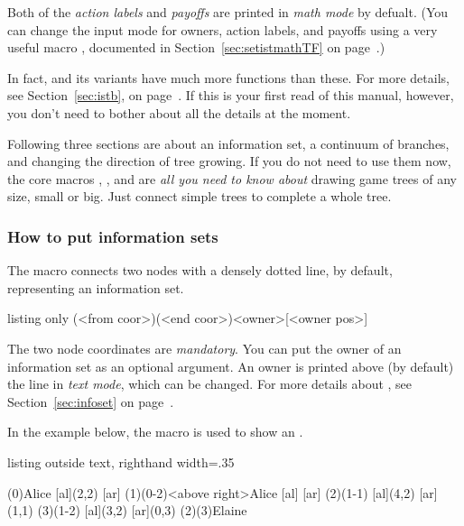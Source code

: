 Both of the \emph{action labels} and \emph{payoffs} are printed in \emph{math mode} by defualt. (You can change the input mode for owners, action labels, and payoffs using a very useful macro \cmd{\setistmathTF}, documented in Section~\ref{sec:setistmathTF} on page~\pageref{sec:setistmathTF}.)

In fact, \cmd{\istb} and its variants have much more functions than these. For more details, see Section~\ref{sec:istb}, on page~\pageref{sec:istb}. If this is your first read of this manual, however, you don't need to bother about all the details at the moment.

Following three sections are about an information set, a continuum of branches, and changing the direction of tree growing. If you do not need to use them now, the core macros \cmd{\istroot}, \cmd{\istb}, and \cmd{\endist} are \emph{all you need to know about} drawing game trees of any size, small or big.
Just connect simple trees to complete a whole tree.

\subsubsection{How to put information sets}

The macro \icmd{\xtInfoset} connects two nodes with a densely dotted line, by default, representing an information set.

\begin{tcblisting}{listing only}
\xtInfoset(<from coor>)(<end coor>){<owner>}[<owner pos>]
\end{tcblisting}


The two node coordinates are \emph{mandatory}.
You can put the owner of an information set as an optional argument. An owner is printed above (by default) the line in \emph{text mode}, which can be changed.
For more details about \cmd{\xtInfoset}, see Section~\ref{sec:infoset} on page~\pageref{sec:infoset}.

In the example below, the macro \cmd{\xtInfoset} is used to show an .

\begin{tcblisting}{listing outside text, righthand width=.35\linewidth}
\begin{istgame}
\xtdistance{15mm}{30mm}
\istroot(0){Alice}
  [al]{(2,2)}
  [ar]
  \endist 
\istroot(1)(0-2)<above right>{Alice}
  [al]
  [ar]
  \endist 
\xtdistance{10mm}{20mm}
\istroot(2)(1-1)
  \istb{\ell}[al]{(4,2)}
  [ar]{(1,1)}
  \endist 
\istroot(3)(1-2)
  \istb{\ell}[al]{(3,2)}
  [ar]{(0,3)}
  \endist 
\xtInfoset(2)(3){Elaine}
\end{istgame}
\end{tcblisting}

